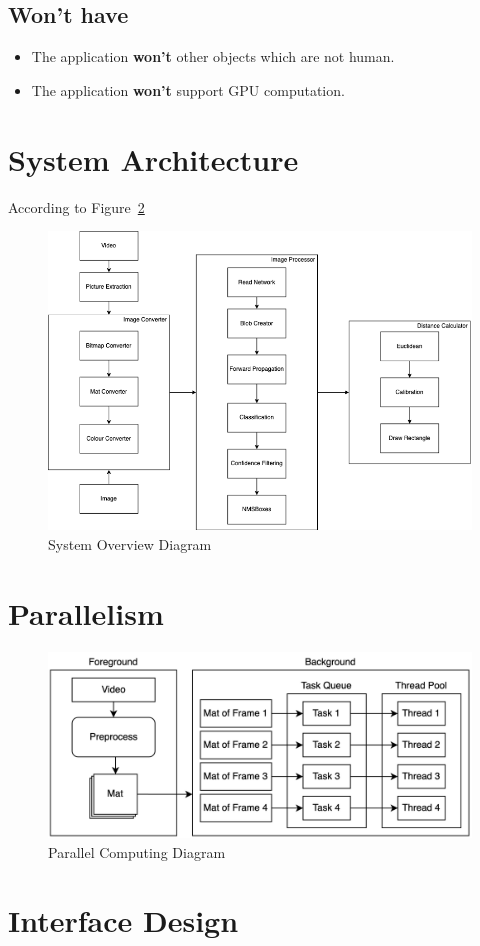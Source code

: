     \subsection{Won't have}
        \begin{itemize}
            \item The application \textbf{won't} other objects which are not human.
            \item The application \textbf{won't} support GPU computation.
        \end{itemize}


\section{System Architecture}
    According to Figure~\ref{systemOverview}

    \begin{figure}[!ht]
        \includegraphics[width=6in]{images/chapter3/system-overview.png}
        \caption{System Overview Diagram}
        \label{systemOverview}
    \end{figure}

\section{Parallelism}
    \begin{figure}[!ht]
        \includegraphics[width=6in]{images/chapter3/parallel.png}
        \caption{Parallel Computing Diagram}
        \label{systemOverview}
    \end{figure}
\section{Interface Design}